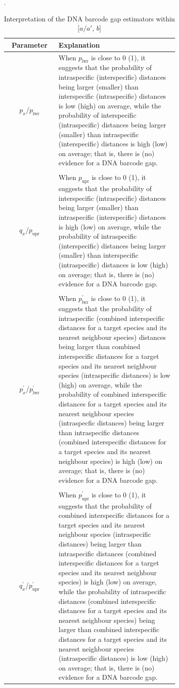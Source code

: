 \documentclass[12pt]{article}
\begin{document}
\begin{table}[htbp]
    \centering
    \small
    \caption{Interpretation of the DNA barcode gap estimators within [$a/a'$, $b$]}.
    \label{tab:parameters}
    \begin{tabular}{cp{0.7\linewidth}}
    \hline
    \textbf{Parameter} & \textbf{Explanation} \\
    \hline
    $p_x$/$p_{\text{lwr}}$ & When $p_{\text{lwr}}$ is close to 0 (1), it suggests that the probability of intraspecific (interspecific) distances being larger (smaller) than interspecific (intraspecific) distances is low (high) on average, while the probability of interspecific (intraspecific) distances being larger (smaller)  than intraspecific (interspecific) distances is high (low) on average; that is, there is (no) evidence for a DNA barcode gap.\\
        & \\[-2mm]
     $q_x$/$p_{\text{upr}}$ & When $p_{\text{upr}}$ is close to 0 (1), it suggests that the probability of interspecific (intraspecific) distances being larger (smaller) than intraspecific (interspecific) distances is high (low) on average, while the probability of intraspecific (interspecific) distances being larger (smaller) than interspecific (intraspecific) distances is low (high) on average; that is, there is (no) evidence for a DNA barcode gap. \\
        & \\[-2mm]
    $p^{'}_x$/$p^{'}_{\text{lwr}}$ & When $p^{'}_{\text{lwr}}$ is close to 0 (1), it suggests that the probability of intraspecific (combined interspecific distances for a target species and its nearest neighbour species) distances being larger than combined interspecific distances for a target species and its nearest neighbour species (intraspecific distances) is low (high) on average, while the probability of combined interspecific distances for a target species and its nearest neighbour species (intraspecfic distances) being larger than intraspecific distances (combined interspecific distances for a target species and its nearest neighbour species) is high (low) on average; that is, there is (no) evidence for a DNA barcode gap.\\
        & \\[-2mm]
     $q^{'}_x$/$p^{'}_{\text{upr}}$ & When $p^{'}_{\text{upr}}$ is close to 0 (1), it suggests that the probability of combined interspecific distances for a target species and its nearest neighbour species (intraspecific distances) being larger than intraspecific distances (combined interspecific distances for a target species and its nearest neighbour species) is high (low) on average, while the probability of intraspecific distances (combined interspecific distances for a target species and its nearest neighbour species) being larger than combined interspecific distances for a target species and its nearest neighbour species (intraspecific distances) is low (high) on average; that is, there is (no) evidence for a DNA barcode gap.\\
    \hline
    \end{tabular}
\end{table}
\end{document}

